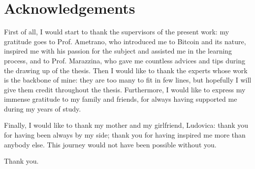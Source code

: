 \chapter{Acknowledgements}
\label{chpr:acknowledgement}

First of all, I would start to thank the supervisors of the present work: my gratitude goes to Prof. Ametrano, who introduced me to Bitcoin and its nature, inspired me with his passion for the subject and assisted me in the learning process, and to Prof. Marazzina, who gave me countless advices and tips during the drawing up of the thesis. Then I would like to thank the experts whose work is the backbone of mine: they are too many to fit in few lines, but hopefully I will give them credit throughout the thesis. Furthermore, I would like to express my immense gratitude to my family and friends, for always having supported me during my years of study. 

\bigskip
\noindent
Finally, I would like to thank my mother and my girlfriend, Ludovica: thank you for having been always by my side; thank you for having inspired me more than anybody else. This journey would not have been possible without you. 

\bigskip 
\noindent
Thank you.
